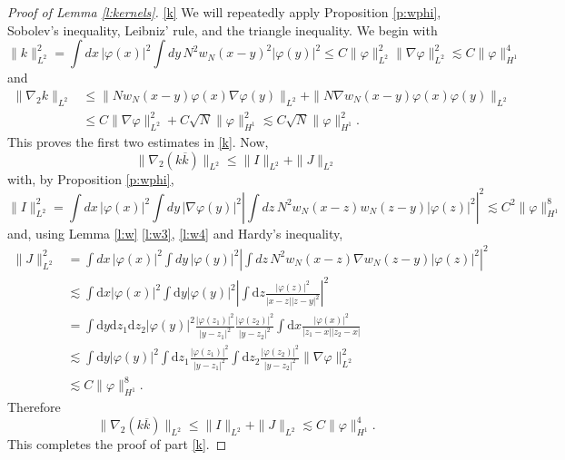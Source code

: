 \documentclass[11pt,a4paper,draft,DIV11]{scrartcl}	%
\let\oldmarginpar\marginpar
\renewcommand\marginpar[1]{\-\oldmarginpar[\raggedleft\footnotesize #1]%
  {\raggedright\footnotesize #1}}
\newcommand{\di}{\textrm{d}}		%
\newcommand{\norm}[1]{\lVert#1\rVert}	%
\begin{document}
\begin{proof}[Proof of Lemma \ref{l:kernels}]
\hspace{-0.3em} %
\ref{k} We will repeatedly apply Proposition \ref{p:wphi}, Sobolev's
  inequality, Leibniz' rule, and the triangle inequality. We begin with
  \[
    \| k \|_{L^2}^2 = \int dx \, |\varphi(x)|^2 \int dy \, N^2 w_N(x-y)^2
    |\varphi(y)|^2 \le C \| \varphi \|_{L^2}^2 \| \nabla \varphi \|_{L^2}^2
    \apprle C \| \varphi \|_{H^1}^4
  \]
  and \marginpar{Notation!}
  \begin{align*}
    \| \nabla_2 k \|_{L^2} & \le \| N w_N(x-y) \varphi(x) \nabla \varphi(y)
    \|_{L^2} + \| N \nabla w_N(x-y) \varphi(x) \varphi(y) \|_{L^2} \\
    & \le C \| \nabla \varphi \|_{L^2}^2 + C \sqrt{N} \| \varphi \|_{H^1}^2
    \apprle C \sqrt{N} \| \varphi \|_{H^1}^2.
  \end{align*}
  This proves the first two estimates in \ref{k}. Now,
  \[
    \| \nabla_2 (k \overline{k}) \|_{L^2} \le \| I \|_{L^2} + \| J \|_{L^2}
  \]
  with, by Proposition \ref{p:wphi},
  \[
    \| I \|_{L^2}^2 = \int dx \, |\varphi(x)|^2 \int dy \, |\nabla
    \varphi(y)|^2 \left| \int dz \, N^2 w_N(x-z) w_N(z-y) |\varphi(z)|^2
    \right|^2 \apprle C^2 \| \varphi \|_{H^1}^8
  \]
  and, using Lemma \ref{l:w} \ref{l:w3}, \ref{l:w4} and Hardy's inequality,
  \begin{align*}
    \| J \|_{L^2}^2 & = \int dx \, |\varphi(x)|^2 \int dy \, |\varphi(y)|^2
    \left| \int dz \, N^2 w_N(x-z) \nabla w_N(z-y) |\varphi(z)|^2 \right|^2 \\
& \apprle \int \di x\lvert\varphi(x)\rvert^2 \int \di y \lvert \varphi(y)\rvert^2
\left\lvert \int \di z \frac{\lvert\varphi(z)\rvert^2}{\lvert x-z\rvert
\lvert z-y\rvert^2} \right\rvert^2 \\
& = \int \di y\di z_1 \di z_2 \lvert \varphi(y)\rvert^2 \frac{\lvert \varphi(z_1)\rvert^2}{\lvert y-z_1\rvert^2} \frac{\lvert\varphi(z_2)\rvert^2}{\lvert y-z_2\rvert^2} \int \di x \frac{\lvert \varphi(x)\rvert^2}{\lvert z_1-x\rvert \lvert z_2 - x\rvert} \\
& \apprle \int \di y \lvert \varphi(y)\rvert^2 \int \di z_1 \frac{\lvert \varphi(z_1)\rvert^2}{\lvert y-z_1\rvert^2} \int \di z_2 \frac{\lvert \varphi(z_2)\rvert^2}{\lvert y-z_2\rvert^2} \norm{\nabla \varphi}_{L^2}^2\\
& \apprle C \norm{\varphi}_{H^1}^8.
  \end{align*}
  Therefore
  \[
    \| \nabla_2 (k \overline{k}) \|_{L^2} \le \| I \|_{L^2} + \| J \|_{L^2}
    \apprle C \| \varphi \|_{H^1}^4.
  \]
  This completes the proof of part \ref{k}.


\end{proof}
\end{document}

